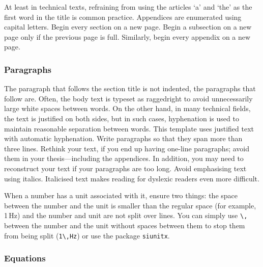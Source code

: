 \documentclass[english, 12pt, a4paper, sci, utf8, a-2b, online]{aaltothesis}
\begin{document}
At least in technical texts, refraining from using the articles ‘a’ and ‘the’ as
the first word in the title is common practice. Appendices are enumerated using 
capital letters. Begin every section on a new page. Begin a subsection on a new 
page only if the previous page is full. Similarly, begin every appendix on a new
page.

\subsubsection{Paragraphs}

The paragraph that follows the section title is not indented, the paragraphs 
that follow are. Often, the body text is typeset as raggedright to avoid 
unnecessarily large white spaces between words. On the other hand, in many 
technical fields, the text is justified on both sides, but in such cases, 
hyphenation is used to maintain reasonable separation between words. This 
template uses justified text with automatic hyphenation. Write paragraphs so 
that they span more than three lines. Rethink your text, if you end up having  
one-line paragraphs; avoid them in your thesis---including the appendices. In 
addition, you may need to reconstruct your text if your paragraphs are too long.
Avoid emphasising text using italics. Italicised text makes reading for dyslexic
readers even more difficult.

When a number has a unit associated with it, ensure two things: the space 
between the number and the unit is smaller than the regular space (for example, 
1\,Hz) and the number and unit are not split over lines. You can simply use 
\verb+\,+ between the number and the unit without spaces between them to stop 
them from being split (\verb+1\,Hz+) or use the package \verb+siunitx+.


\subsubsection{Equations}
\end{document}
